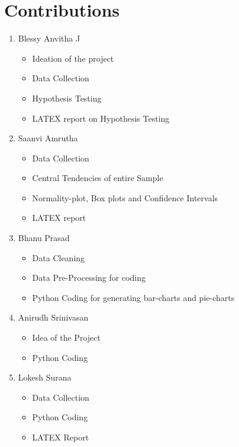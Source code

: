 \documentclass{article}
\begin{document}
\section{Contributions}
\begin{enumerate}
\item Blessy Anvitha J
\begin{itemize}
  \item Ideation of the project
  \item Data Collection
  \item Hypothesis Testing 
  \item LATEX report on Hypothesis Testing
\end{itemize}
\item Saanvi Amrutha
\begin{itemize}
  \item Data Collection
  \item Central Tendencies of entire Sample
  \item Normality-plot, Box plots and Confidence Intervals
  \item LATEX report
\end{itemize}
\item Bhanu Prasad
\begin{itemize}
  \item Data Cleaning
  \item Data Pre-Processing for coding
  \item Python Coding for generating bar-charts and pie-charts
\end{itemize}
\item Anirudh Srinivasan
\begin{itemize}
  \item Idea of the Project
  \item Python Coding
\end{itemize}
\item Lokesh Surana
\begin{itemize}
  \item Data Collection
  \item Python Coding
  \item LATEX Report
\end{itemize}


\end{enumerate}
\end{document}
